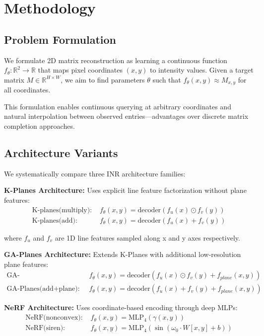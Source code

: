 \documentclass[10pt,twocolumn,letterpaper]{article}
\begin{document}
\section{Methodology}

\subsection{Problem Formulation}

We formulate 2D matrix reconstruction as learning a continuous function $f_\theta: \mathbb{R}^2 \rightarrow \mathbb{R}$ that maps pixel coordinates $(x, y)$ to intensity values. Given a target matrix $M \in \mathbb{R}^{H \times W}$, we aim to find parameters $\theta$ such that $f_\theta(x, y) \approx M_{x,y}$ for all coordinates.

This formulation enables continuous querying at arbitrary coordinates and natural interpolation between observed entries—advantages over discrete matrix completion approaches.

\subsection{Architecture Variants}

We systematically compare three INR architecture families:

\textbf{K-Planes Architecture:} Uses explicit line feature factorization without plane features:
\begin{align}
\text{K-planes(multiply): } &f_\theta(x,y) = \text{decoder}(f_u(x) \odot f_v(y)) \\
\text{K-planes(add): } &f_\theta(x,y) = \text{decoder}(f_u(x) + f_v(y))
\end{align}

where $f_u$ and $f_v$ are 1D line features sampled along x and y axes respectively.

\textbf{GA-Planes Architecture:} Extends K-Planes with additional low-resolution plane features:
\begin{align}
\text{GA-Planes(multiply+plane): } &f_\theta(x,y) = \text{decoder}(f_u(x) \odot f_v(y) + f_{plane}(x,y)) \\
\text{GA-Planes(add+plane): } &f_\theta(x,y) = \text{decoder}(f_u(x) + f_v(y) + f_{plane}(x,y))
\end{align}

\textbf{NeRF Architecture:} Uses coordinate-based encoding through deep MLPs:
\begin{align}
\text{NeRF(nonconvex): } &f_\theta(x,y) = \text{MLP}_4(\gamma(x,y)) \\
\text{NeRF(siren): } &f_\theta(x,y) = \text{MLP}_4(\sin(\omega_0 \cdot W[x,y] + b))
\end{align}
\end{document}
